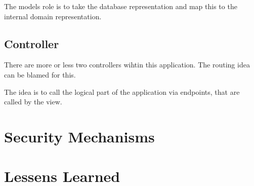 \documentclass[a4paper]{spie}
\begin{document}
The models role is to take the database representation and map this to the internal domain representation.
\subsection{Controller}\label{sec:controller}
There are more or less two controllers wihtin this application.
The routing idea can be blamed for this.

The idea is to call the logical part of the application via endpoints, that are called by the view.


\section{Security Mechanisms}


\section{Lessens Learned}
\newpage


\end{document}

